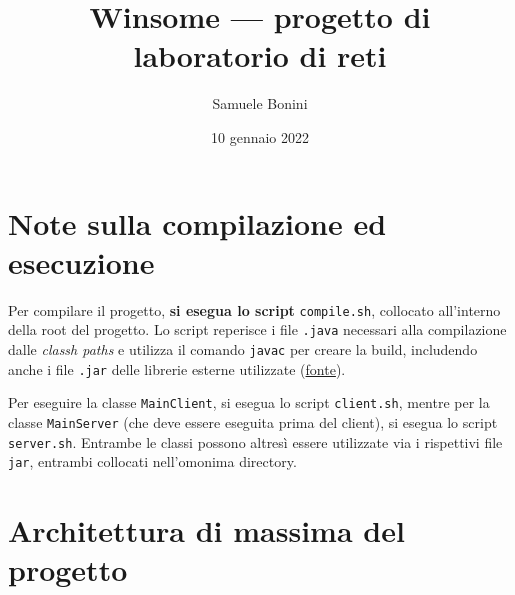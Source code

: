 \documentclass[a4paper,8pt]{article} %
\title{Winsome --- progetto di laboratorio di reti} %
\author{Samuele Bonini}
\date{10 gennaio 2022}
\def\code#1{\texttt{#1}}
\begin{document}
\maketitle %



\tableofcontents %
\setlength{\parskip}{0.5em}

\section{Note sulla compilazione ed esecuzione}
Per compilare il progetto, \textbf{si esegua lo script} \code{compile.sh}, collocato all'interno della root del progetto.
Lo script reperisce i file \code{.java}  necessari alla compilazione dalle \emph{classh paths} e utilizza il comando \code{javac} per creare la build,
includendo anche i file \code{.jar} delle librerie esterne utilizzate (\href{https://twin.sh/articles/8/how-to-compile-large-java-projects-from-terminal}{fonte}).

\par Per eseguire la classe \code{MainClient}, si esegua lo script \code{client.sh}, mentre per la classe \code{MainServer} (che deve essere
eseguita prima del client), si esegua lo script \code{server.sh}. Entrambe le classi possono altresì essere utilizzate via i rispettivi file \code{jar}, entrambi collocati nell'omonima directory.

\section{Architettura di massima del progetto} %
\end{document}
